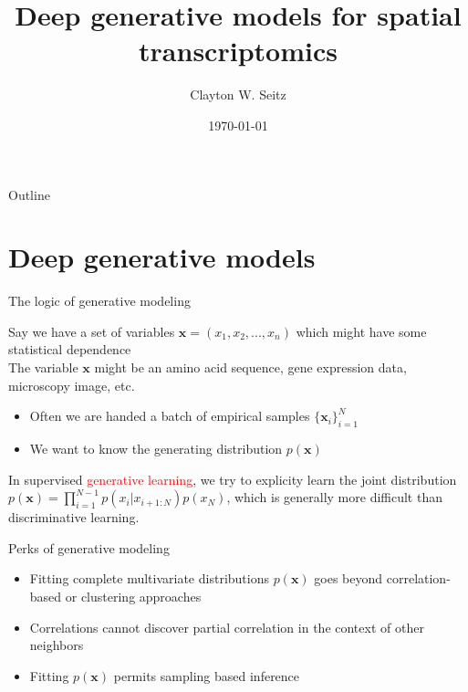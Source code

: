 \documentclass{beamer}					%
\title{Deep generative models for spatial transcriptomics}	%
\author{Clayton W. Seitz}								%
\date{\today}									%
\begin{document}
\begin{frame}
  \titlepage
\end{frame}

\begin{frame}{Outline}
  \tableofcontents
\end{frame}

%


\section{Deep generative models}

\begin{frame}{The logic of generative modeling}

Say we have a set of variables $\mathbf{x} = (x_{1},x_{2},...,x_{n})$ which might have some statistical dependence\\
\vspace{0.1in}
The variable $\mathbf{x}$ might be an amino acid sequence, gene expression data, microscopy image, etc.\\
\vspace{0.1in}
\begin{itemize}
\item Often we are handed a batch of empirical samples $\{\mathbf{x}_{i}\}_{i=1}^{N}$
\item We want to know the generating distribution $p(\mathbf{x})$
\end{itemize}

In supervised \textcolor{red}{generative learning}, we try to explicity learn the joint distribution $p(\mathbf{x}) = \prod_{i=1}^{N-1}p(x_{i}|x_{i+1:N})p(x_{N})$, which is generally more difficult than discriminative learning. 

\end{frame}


\begin{frame}{Perks of generative modeling}

\begin{itemize}
\item Fitting complete multivariate distributions $p(\mathbf{x})$ goes beyond correlation-based or clustering approaches
\item Correlations cannot discover partial correlation in the context of other neighbors
\item Fitting $p(\mathbf{x})$ permits sampling based inference
\end{itemize}

\end{frame}
\end{document}
